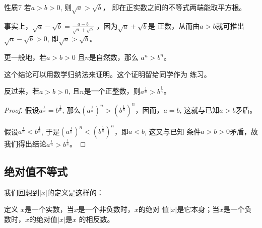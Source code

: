 \begin{blk}{性质7}
    若$a>b>0$, 则$\sqrt{a}>\sqrt{b}$，
 即在正实数之间的不等式两端能取平方根。
\end{blk}

事实上，$\sqrt{a}-\sqrt{b}=\frac{a-b}{\sqrt{a}+\sqrt{b}}$
，因为$\sqrt{a}+\sqrt{b}$是
正数，从而由$a>b$就可推出$\sqrt{a}-\sqrt{b}>0$, 即$\sqrt{a}>\sqrt{b}$。

更一般地，若$a>b>0$ 且$n$是自然数，那么
$a^n>b^n$。

这个结论可以用数学归纳法来证明。这个证明留给同学作为
练习。

反过来，若$a>b>0$, 且$n$是一个正整数，则$a^{\tfrac{1}{n}}>b^{\tfrac{1}{n}}$。

\begin{proof}
    假设$a^{\tfrac{1}{n}}=b^{\tfrac{1}{n}}$, 那么$\left(a^{\tfrac{1}{n}}\right)^n>\left(b^{\tfrac{1}{n}}\right)^n$，因而，$a=b$, 这就与已知$a>b$矛盾。

假设$a^{\tfrac{1}{n}}<b^{\tfrac{1}{n}}$, 于是$\left(a^{\tfrac{1}{n}}\right)^n<\left(b^{\tfrac{1}{n}}\right)^n$，即$a<b$, 这又与已知
条件$a>b>0$矛盾，故我们得出结论$a^{\tfrac{1}{n}}>b^{\tfrac{1}{n}}$。
\end{proof}


\subsection{绝对值不等式}
我们回想到$|x|$的定义是这样的：

\begin{blk}{定义}
$x$是一个实数，当$x$是一个非负数时，$x$的绝对
值$|x|$是它本身；当$x$是一个负数时，$x$的绝对值$|x|$是$x$
的相反数。



\end{blk}









\begin{example}
    
\end{example}


\begin{solution}
    
\end{solution}

\begin{example}
    
\end{example}

